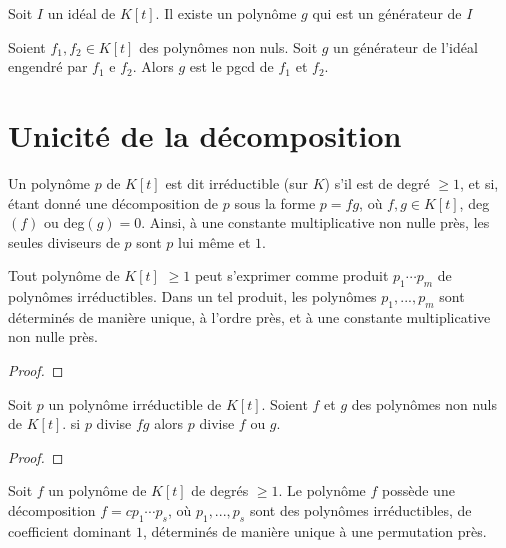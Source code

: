     \begin{theoreme}
        Soit $I$ un idéal de $K[t]$. Il existe un polynôme $g$ qui est un générateur de $I$
    \end{theoreme}

\begin{theoreme}
    Soient $f_1,f_2\in K[t]$ des polynômes non nuls. Soit $g$ un générateur de l'idéal engendré par $f_1$ e $f_2$. Alors $g$ est le pgcd de $f_1$ et $f_2$.
\end{theoreme}

\section{Unicité de la décomposition}

    \begin{definition}
        Un polynôme $p$ de $K[t]$ est dit irréductible (sur $K$) s'il est de degré $\geq 1$, et si, étant donné une décomposition de $p$ sous la forme $p=fg$, où $f,g\in K[t]$, deg$(f)$ ou deg$(g)=0$. Ainsi, à une constante multiplicative non nulle près, les seules diviseurs de $p$ sont $p$ lui même et $1$.
    \end{definition}

    \begin{theoreme}
        Tout polynôme de $K[t]$ $\geq 1$ peut s'exprimer comme produit $p_1\cdots p_m$ de polynômes irréductibles. Dans un tel produit, les polynômes $p_1,...,p_m$ sont déterminés de manière unique, à l'ordre près, et à une constante multiplicative non nulle près.
    \end{theoreme}

\begin{proof}
\end{proof}

    \begin{lemme}
        Soit $p$ un polynôme irréductible de $K[t]$. Soient $f$ et $g$ des polynômes non nuls de $K[t]$. si $p$ divise $fg$ alors $p$ divise $f$ ou $g$.
    \end{lemme}

\begin{proof}
\end{proof}

    \begin{corollaire}
        Soit $f$ un polynôme de $K[t]$ de degrés $\geq 1$. Le polynôme $f$ possède une décomposition $f=cp_1\cdots p_s$, où $p_1,...,p_s$ sont des polynômes irréductibles, de coefficient dominant $1$, déterminés de manière unique à une permutation près.
    \end{corollaire}

